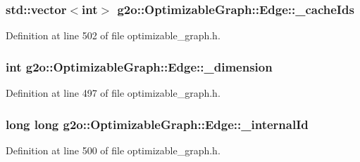 \subsubsection[{\texorpdfstring{\+\_\+cache\+Ids}{_cacheIds}}]{\setlength{\rightskip}{0pt plus 5cm}std\+::vector$<$int$>$ g2o\+::\+Optimizable\+Graph\+::\+Edge\+::\+\_\+cache\+Ids\hspace{0.3cm}{\ttfamily [protected]}}\hypertarget{classg2o_1_1OptimizableGraph_1_1Edge_a56bddaadd70570dbd96e8deed3d4b34c}{}\label{classg2o_1_1OptimizableGraph_1_1Edge_a56bddaadd70570dbd96e8deed3d4b34c}


Definition at line 502 of file optimizable\+\_\+graph.\+h.

\subsubsection[{\texorpdfstring{\+\_\+dimension}{_dimension}}]{\setlength{\rightskip}{0pt plus 5cm}int g2o\+::\+Optimizable\+Graph\+::\+Edge\+::\+\_\+dimension\hspace{0.3cm}{\ttfamily [protected]}}\hypertarget{classg2o_1_1OptimizableGraph_1_1Edge_a4e651628f7657c81d0e4c1b26caaa6aa}{}\label{classg2o_1_1OptimizableGraph_1_1Edge_a4e651628f7657c81d0e4c1b26caaa6aa}


Definition at line 497 of file optimizable\+\_\+graph.\+h.

\subsubsection[{\texorpdfstring{\+\_\+internal\+Id}{_internalId}}]{\setlength{\rightskip}{0pt plus 5cm}long long g2o\+::\+Optimizable\+Graph\+::\+Edge\+::\+\_\+internal\+Id\hspace{0.3cm}{\ttfamily [protected]}}\hypertarget{classg2o_1_1OptimizableGraph_1_1Edge_abdfc449ed57479d90d2e57a8bc0bea12}{}\label{classg2o_1_1OptimizableGraph_1_1Edge_abdfc449ed57479d90d2e57a8bc0bea12}


Definition at line 500 of file optimizable\+\_\+graph.\+h.



